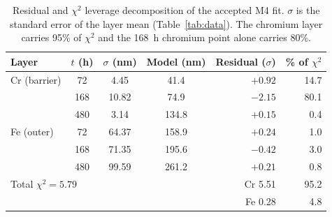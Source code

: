 \documentclass[a4paper,fleqn]{cas-sc}
\begin{document}
\begin{table}[htbp]
\centering
\caption{Residual and $\chi^2$ leverage decomposition of the accepted M4
fit. $\sigma$ is the standard error of the layer mean
(Table~\ref{tab:data}). The chromium layer carries 95\% of $\chi^2$ and
the 168~h chromium point alone carries 80\%.}
\label{tab:leverage}
\small
\begin{tabular}{lcccrr}
\toprule
Layer & $t$ (h) & $\sigma$ (nm) & Model (nm) & Residual ($\sigma$) & \% of $\chi^2$ \\
\midrule
Cr (barrier) & 72 & 4.45 & 41.4 & $+0.92$ & 14.7 \\
 & 168 & 10.82 & 74.9 & $-2.15$ & 80.1 \\
 & 480 & 3.14 & 134.8 & $+0.15$ & 0.4 \\
Fe (outer) & 72 & 64.37 & 158.9 & $+0.24$ & 1.0 \\
 & 168 & 71.35 & 195.6 & $-0.42$ & 3.0 \\
 & 480 & 99.59 & 261.2 & $+0.21$ & 0.8 \\
\midrule
\multicolumn{4}{l}{Total $\chi^2 = 5.79$} & Cr 5.51 & 95.2 \\
\multicolumn{4}{l}{} & Fe 0.28 & 4.8 \\
\bottomrule
\end{tabular}
\end{table}
\end{document}
